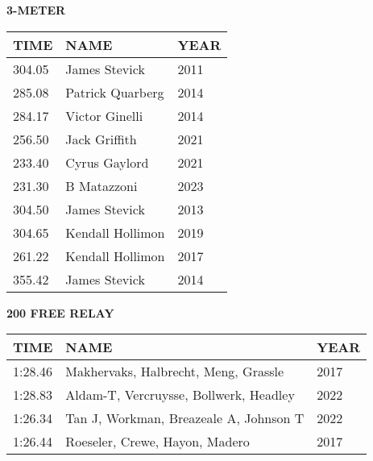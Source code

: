 \begin{table}[H]
\centering
\begin{minipage}[t]{0.6\textwidth}
\centering
\textbf{3-METER}\\[0.1cm]
\begin{tabular}{@{}p{1.8cm}p{2.8cm}p{1.2cm}@{}}
\hline
    \textbf{TIME} & \textbf{NAME} & \textbf{YEAR} \\
\hline
    304.05 & James Stevick & 2011 \\
    285.08 & Patrick Quarberg & 2014 \\
    284.17 & Victor Ginelli & 2014 \\
    256.50 & Jack Griffith & 2021 \\
    233.40 & Cyrus Gaylord & 2021 \\
    231.30 & B Matazzoni & 2023 \\
    304.50 & James Stevick & 2013 \\
    304.65 & Kendall Hollimon & 2019 \\
    261.22 & Kendall Hollimon & 2017 \\
    355.42 & James Stevick & 2014 \\
\hline
\end{tabular}
\end{minipage}
\end{table}

\begin{table}[H]
\centering
\begin{minipage}[t]{0.6\textwidth}
\centering
\textbf{200 FREE RELAY}\\[0.1cm]
\begin{tabular}{@{}p{1.8cm}p{2.8cm}p{1.2cm}@{}}
\hline
    \textbf{TIME} & \textbf{NAME} & \textbf{YEAR} \\
\hline
    1:28.46 & Makhervaks, Halbrecht, Meng, Grassle & 2017 \\
    1:28.83 & Aldam-T, Vercruysse, Bollwerk, Headley & 2022 \\
    1:26.34 & Tan J, Workman, Breazeale A, Johnson T & 2022 \\
    1:26.44 & Roeseler, Crewe, Hayon, Madero & 2017 \\
\hline
\end{tabular}
\end{minipage}
\end{table}


